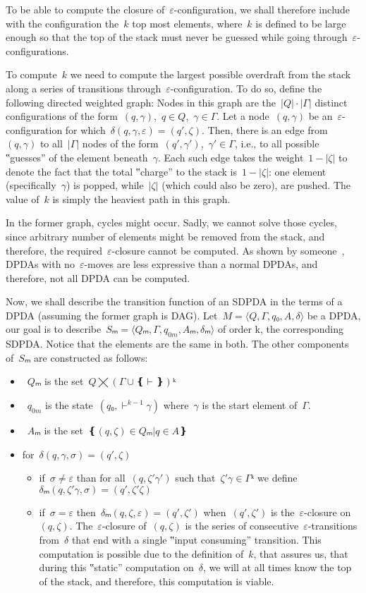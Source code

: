 To be able to compute the closure of~$ε$-configuration, we shall
  therefore include with the configuration the~$k$ top most elements,
  where~$k$ is defined to be large enough so that
  the top of the stack must never be guessed while going
  through~$ε$-configurations.

To compute~$k$ we need to compute the largest possible overdraft
  from the stack along a series of transitions through~$ε$-configuration.
To do so, define the following directed weighted graph:
Nodes in this graph are the~$|Q|·|Γ|$ distinct configurations
  of the form~$(q,γ)$,~$q∈Q$,~$γ∈Γ$.
Let a node~$(q,γ)$ be an~$ε$-configuration for which~$δ(q,γ,ε)=(q',ζ)$.
Then, there is an edge from~$(q,γ)$ to all~$|Γ|$ nodes of the form~$(q',γ')$,~$γ'∈Γ$, i.e.,
  to all possible ‟guesses” of the element beneath~$γ$.
Each such edge takes the weight~$1-|ζ|$ to denote the fact
  that the total ‟charge” to the stack is~$1-|ζ|$:
    one element (specifically~$γ$) is popped,
    while~$|ζ|$ (which could also be zero), are pushed.
The value of~$k$ is simply the heaviest path in this graph.

In the former graph, cycles might occur.
Sadly, we cannot solve those cycles, since arbitrary number of elements might be removed from the
  stack, and therefore, the required~$ε$-closure cannot be computed.
As shown by someone~\cite{i:need:to::find:it}, DPDAs with no~$ε$-moves are less expressive than a normal DPDAs,
  and therefore, not all DPDA can be computed.

Now, we shall describe the transition function of an SDPDA in the terms of a DPDA (assuming the former graph is DAG).
Let~$M=⟨Q,Γ,q₀,A,δ⟩$ be a DPDA, our goal is to describe~$Sₘ=⟨Qₘ,Γ,q_{0m},Aₘ,δₘ⟩$
of order k, the corresponding SDPDA\@.
Notice that the elements are the same in both.
The other components of~$Sₘ$ are constructed as follows:
\begin{itemize}
  \item~$Qₘ$ is the set~$Q⨉\left(Γ∪❴\vdash❵\right)ᵏ$
  \item~$q_{0m}$ is the state~$(q₀,\vdash^{k-1}γ)$ where~$γ$ is the start element of~$Γ$.
  \item~$Aₘ$ is the set~$❴(q,ζ)∈Qₘ | q∈A❵$
  \item for~$δ(q,γ,σ) = (q',ζ)$
        \begin{itemize}
          \item if~$σ≠ε$ than for all~$(q,ζ'γ')$ such that~$ζ'γ∈Γᵏ$ we
            define~$δₘ(q,ζ'γ,σ)=(q',ζ'ζ)$
          \item if~$σ=ε$ then~$δₘ(q,ζ,ε)=(q',ζ')$ when~$(q',ζ')$ is
            the~$ε$-closure on~$(q,ζ)$.  The~$ε$-closure of~$(q,ζ)$ is the
            series of consecutive~$ε$-transitions from~$δ$ that end with a
            single ‟input consuming” transition.  This computation is possible
            due to the definition of~$k$, that assures us, that during this
            ‟static” computation on~$δ$, we will at all times know the top of
            the stack, and therefore, this computation is viable.
        \end{itemize}
\end{itemize}

